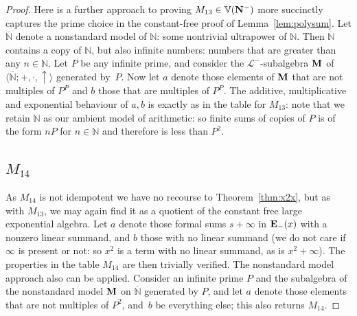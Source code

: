 \documentclass[eqnor,reqno]{amsart}
\theoremstyle{plain}
\theoremstyle{definition}
\begin{document}
\begin{proof}
Here is a further approach to proving $M_{13}\in\mathbb{V}({\bf N}^-)$ more succinctly captures the prime choice in the constant-free proof of Lemma~\ref{lem:polysum}.  
Let $\overline{\mathbb{N}}$ denote a nonstandard model of $\mathbb{N}$: some nontrivial ultrapower of $\mathbb{N}$.  
Then $\overline{\mathbb{N}}$ contains a copy of $\mathbb{N}$, but also infinite numbers: numbers that are greater than any $n\in \mathbb{N}$.  
Let $P$ be any infinite prime, and consider the $\mathscr{L}^-$-subalgebra ${\bf M}$ of $\langle\overline{\mathbb{N}};+,\cdot,\uparrow\rangle$ generated by~$P$.  
Now let $a$ denote those elements of ${\bf M}$ that are not multiples of $P^P$ and $b$ those that are multiples of $P^P$.
The additive, multiplicative and exponential behaviour of $a,b$ is exactly as in the table for $M_{13}$: note that we retain $\mathbb{N}$ as our ambient model of arithmetic: so finite sums of copies of $P$ is of the form $nP$ for $n\in \mathbb{N}$ and therefore is less than $P^2$.

\subsection{$M_{14}$} 
As $M_{14}$ is not idempotent we have no recourse to Theorem~\ref{thm:x2x}, but as with $M_{13}$, we may again find it as a quotient of the constant free large exponential algebra. 
Let $a$ denote those formal sums $s+\infty$ in ${\bf E}_-(x)$ with a nonzero linear summand, and $b$ those with no linear summand (we do not care if $\infty$ is present or not: so $x^2$ is a term with no linear summand, as is $x^2+\infty$).    
The properties in the table $M_{14}$ are then trivially verified.
The nonstandard model approach also can be applied.  Consider an infinite prime $P$ and the subalgebra of the nonstandard model ${\bf M}$ on $\overline{\mathbb{N}}$ generated by $P$, and let $a$ denote those elements that are not multiples of $P^2$, and~$b$ be everything else; this also returns $M_{14}$.


\end{proof}
\end{document}
